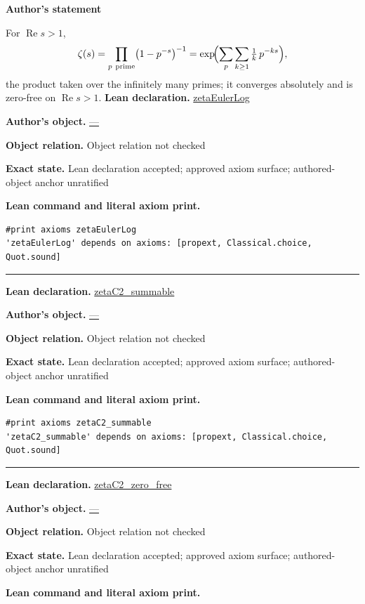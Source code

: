 \documentclass[11pt]{article}
\DeclareMathOperator{\re}{Re}
\theoremstyle{plain}
\theoremstyle{definition}
\theoremstyle{remark}
\begin{document}
\begin{tcolorbox}[provenancecard,title={2. Theorem - Infinite Euler product; \{\textbackslash{}cite[Ch.\textasciitilde{}1]\{Titchmarsh86\}\}},title after break={2. Theorem - Infinite Euler product; \{\textbackslash{}cite[Ch.\textasciitilde{}1]\{Titchmarsh86\}\} (continued)}]
\textbf{Author's statement}\par
For $\re s>1$,
\[
  \zeta(s)=\prod_{p\ \mathrm{prime}}\bigl(1-p^{-s}\bigr)^{-1}
         =\exp\!\Bigl(\sum_{p}\sum_{k\ge1}\tfrac1k\,p^{-ks}\Bigr),
\]
the product taken over the infinitely many primes; it converges absolutely and is zero-free on
$\re s>1$.
\tcblower
\textbf{Lean declaration.} \url{zetaEulerLog}
\par\textbf{Author's object.} \url{—}
\par\textbf{Object relation.} Object relation not checked
\par\textbf{Exact state.} Lean declaration accepted; approved axiom surface; authored-object anchor unratified
\par\smallskip\textbf{Lean command and literal axiom print.}
\begin{Verbatim}[breaklines=true,breakanywhere=true,fontsize=\small]
#print axioms zetaEulerLog
'zetaEulerLog' depends on axioms: [propext, Classical.choice, Quot.sound]
\end{Verbatim}
\medskip\hrule\medskip
\textbf{Lean declaration.} \url{zetaC2_summable}
\par\textbf{Author's object.} \url{—}
\par\textbf{Object relation.} Object relation not checked
\par\textbf{Exact state.} Lean declaration accepted; approved axiom surface; authored-object anchor unratified
\par\smallskip\textbf{Lean command and literal axiom print.}
\begin{Verbatim}[breaklines=true,breakanywhere=true,fontsize=\small]
#print axioms zetaC2_summable
'zetaC2_summable' depends on axioms: [propext, Classical.choice, Quot.sound]
\end{Verbatim}
\medskip\hrule\medskip
\textbf{Lean declaration.} \url{zetaC2_zero_free}
\par\textbf{Author's object.} \url{—}
\par\textbf{Object relation.} Object relation not checked
\par\textbf{Exact state.} Lean declaration accepted; approved axiom surface; authored-object anchor unratified
\par\smallskip\textbf{Lean command and literal axiom print.}

\end{tcolorbox}
\end{document}
